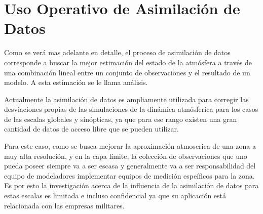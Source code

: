 \section{Uso Operativo de Asimilación de Datos}

Como se verá mas adelante en detalle, el proceso de asimilación de datos corresponde a buscar la mejor  estimación del estado de la atmósfera a través de una combinación lineal entre un conjunto de observaciones y el resultado de un modelo. A esta estimación se le llama análisis.

Actualmente la asimilación de datos es ampliamente utilizada para corregir las desviaciones propias de las simulaciones de la dinámica atmósferica para los casos de las escalas globales y sinópticas, ya que para ese rango existen una gran cantidad de datos de acceso libre que se pueden utilizar.

Para este caso, como se busca mejorar la aproximación atmoserica de una zona a muy alta resolución, y en la capa límite, la colección de observaciones que uno pueda poseer siempre va a ser escasa y generalmente va a ser responsabilidad del equipo de modeladores implementar equipos de medición espeíficos para la zona. Es por esto la investigación acerca de la influencia de la asimilación de datos para estas escalas es limitada e incluso confidencial ya que su aplicación está relacionada con las empresas militares.



